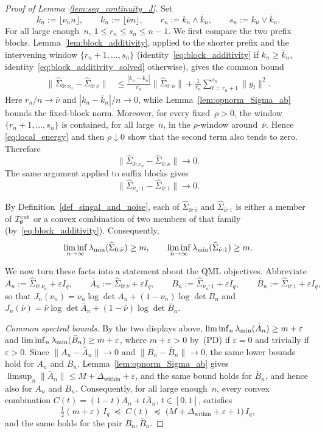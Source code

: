 \documentclass[10pt, letterpaper]{amsart}
\def\min{{\rm min}}
\begin{document}
\begin{proof}[Proof of Lemma~\ref{lem:seq_continuity_J}]
Set
\[
k_n:=\lfloor \nu_n n\rfloor,
\qquad
\bar k_n:=\lfloor \bar\nu n\rfloor,
\qquad
r_n:=k_n\wedge\bar k_n,
\qquad
s_n:=k_n\vee\bar k_n.
\]
For all large enough~$n$, $1\leq r_n\leq s_n\leq n-1$.
We first compare the two prefix blocks.  Lemma~\ref{lem:block_additivity}, applied to the shorter prefix and the intervening window $\{r_n+1,\ldots,s_n\}$ (identity~\eqref{eq:block_additivity} if $k_n\geq\bar k_n$, identity~\eqref{eq:block_additivity_solved} otherwise), gives the common bound
\begin{align*}
\big\|\widehat\Sigma_{0:\nu_n}-\widehat\Sigma_{0:\bar\nu}\big\|
&\leq
\frac{|k_n-\bar k_n|}{r_n}
\big\|\widehat\Sigma_{0:\bar\nu}\big\|
+\frac1{r_n}\sum_{t=r_n+1}^{s_n}\|y_t\|^2 .
\end{align*}
Here $r_n/n\to\bar\nu$ and $|k_n-\bar k_n|/n\to0$, while
Lemma~\ref{lem:opnorm_Sigma_ab} bounds the fixed-block norm. Moreover, for
every fixed~$\rho>0$, the window $\{r_n+1,\ldots,s_n\}$ is contained, for all
large~$n$, in the $\rho$-window around~$\bar\nu$. Hence
\eqref{eq:local_energy} and then $\rho\downarrow0$ show that the second term
also tends to zero. Therefore
\[
\big\|\widehat\Sigma_{0:\nu_n}-\widehat\Sigma_{0:\bar\nu}\big\|
\longrightarrow0.
\]
The same argument applied to suffix blocks gives
\[
\big\|\widehat\Sigma_{\nu_n:1}-\widehat\Sigma_{\bar\nu:1}\big\|
\longrightarrow0.
\]

By Definition~\ref{def_singal_and_noise}, each of
$\widehat\Sigma_{0:\bar\nu}$ and
$\widehat\Sigma_{\bar\nu:1}$ is either a member of
$\mathcal I_\theta^{\rm cut}$ or a convex combination of two members of that family  (by~\eqref{eq:block_additivity}).
Consequently,
\[
\liminf_{n\to\infty}\lambda_{\min}(\widehat\Sigma_{0:\bar\nu})\geq m,
\qquad
\liminf_{n\to\infty}\lambda_{\min}(\widehat\Sigma_{\bar\nu:1})\geq m.
\]

We now turn these facts into a statement about the QML objectives. Abbreviate
\[
A_n:=\widehat\Sigma_{0:\nu_n}+\varepsilon I_q,\qquad
\bar A_n:=\widehat\Sigma_{0:\bar\nu}+\varepsilon I_q,\qquad
B_n:=\widehat\Sigma_{\nu_n:1}+\varepsilon I_q,\qquad
\bar B_n:=\widehat\Sigma_{\bar\nu:1}+\varepsilon I_q,
\]
so that $J_n(\nu_n)=\nu_n\log\det A_n+(1-\nu_n)\log\det B_n$ and $J_n(\bar\nu)=\bar\nu\log\det\bar A_n+(1-\bar\nu)\log\det\bar B_n$.

\emph{Common spectral bounds.} By the two displays above,
$\liminf_{n}\lambda_{\min}(\bar A_n)\geq m+\varepsilon$ and
$\liminf_{n}\lambda_{\min}(\bar B_n)\geq m+\varepsilon$, where $m+\varepsilon>0$
by~(PD) if $\varepsilon=0$ and trivially if $\varepsilon>0$. Since
$\|A_n-\bar A_n\|\to0$ and $\|B_n-\bar B_n\|\to0$, the same lower bounds hold
for $A_n$ and $B_n$. Lemma~\ref{lem:opnorm_Sigma_ab} gives
$\limsup_{n}\|\bar A_n\|\leq M+\Delta_{\mathrm{within}}+\varepsilon$, and the
same bound holds for $\bar B_n$, and hence also for $A_n$ and $B_n$.
Consequently, for all large enough~$n$, every convex combination
$C(t)=(1-t)A_n+t\bar A_n$, $t\in[0,1]$, satisfies
\[
\tfrac12(m+\varepsilon)\,I_q
\;\preceq\; C(t)\;\preceq\;
\big(M+\Delta_{\mathrm{within}}+\varepsilon+1\big)\,I_q,
\]
and the same holds for the pair $B_n,\bar B_n$.


\end{proof}
\end{document}
